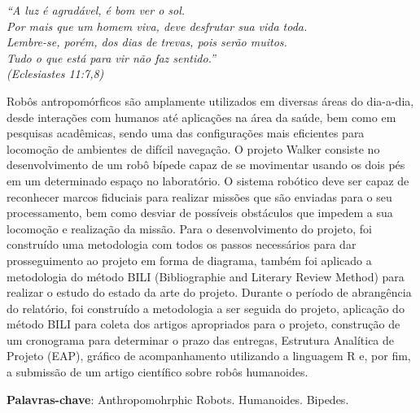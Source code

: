 \documentclass[
	12pt,				%
	openright,			%
	twoside,			%
	a4paper,			%
	english,			%
	french,				%
	spanish,			%
	brazil				%
	]{senai-cimatec-abntex2}
\begin{document}
\begin{epigrafe}
	\vspace*{\fill}
	\begin{flushright}
		\textit{``A luz é agradável, é bom ver o sol.\\
			Por mais que um homem viva, deve desfrutar sua vida toda.\\ Lembre-se, porém, dos dias de trevas, pois serão muitos. \\ Tudo o que está para vir não faz sentido.''\\
			(Eclesiastes 11:7,8)}
	\end{flushright}
\end{epigrafe}

\setlength{\absparsep}{18pt} %
\begin{resumo}

	Robôs antropomórficos são amplamente utilizados em diversas áreas do dia-a-dia, desde interações com humanos até aplicações na área da saúde, bem como em pesquisas acadêmicas, sendo uma das configurações mais eficientes para locomoção de ambientes de difícil navegação. \newline
	O projeto Walker consiste no desenvolvimento de um robô bípede capaz de se movimentar usando os dois pés em um determinado espaço no laboratório. O sistema robótico deve ser capaz de reconhecer marcos fiduciais para realizar missões que são enviadas para o seu processamento, bem como desviar de possíveis obstáculos que impedem a sua locomoção e realização da missão.\newline
	Para o desenvolvimento do projeto, foi construído uma metodologia com todos os passos necessários para dar prosseguimento ao projeto em forma de diagrama, também foi aplicado a metodologia do método BILI (Bibliographie and Literary Review Method) para realizar o estudo do estado da arte do projeto.\newline
	Durante o período de abrangência do relatório, foi construído a metodologia a ser seguida do projeto, aplicação do método BILI para coleta dos artigos apropriados para o projeto, construção de um cronograma para determinar o prazo das entregas, Estrutura Analítica de Projeto (EAP), gráfico de acompanhamento utilizando a linguagem R e, por fim, a submissão de um artigo científico sobre robôs humanoides.\newline

	\textbf{Palavras-chave}: Anthropomohrphic Robots. Humanoides. Bipedes.
\end{resumo}
\end{document}
